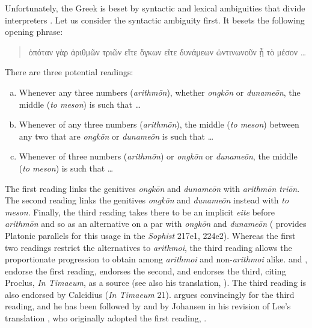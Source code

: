 Unfortunately, the Greek is beset by syntactic and lexical ambiguities that divide interpreters \citep{Prtichard:1990aa}. Let us consider the syntactic ambiguity first. It besets the following opening phrase:
\begin{quote}
{\sbl ὁπόταν γὰρ ἀριθμῶν τριῶν εἴτε ὄγκων εἴτε δυνάμεων ὡντινωνοῦν ᾖ τὸ μέσον \ldots}
\end{quote}
There are three potential readings:
\begin{enumerate}[(a)]
	\item Whenever any three numbers (\emph{arithmōn}), whether \emph{ongkōn} or \emph{dunameōn}, the middle (\emph{to meson}) is such that \ldots
	\item Whenever of any three numbers (\emph{arithmōn}), the middle (\emph{to meson}) between any two that are \emph{ongkōn} or \emph{dunameōn} is such that \ldots
	\item Whenever of three numbers  (\emph{arithmōn}) or \emph{ongkōn} or \emph{dunameōn}, the middle (\emph{to meson}) is such that \ldots
\end{enumerate}
The first reading links the genitives \emph{ongkōn} and \emph{dunameōn} with \emph{arithmōn triōn}. The second reading links the genitives \emph{ongkōn} and \emph{dunameōn} instead with \emph{to meson}. Finally, the third reading takes there to be an implicit \emph{eite} before \emph{arithmōn} and so as an alternative on a par with \emph{ongkōn} and \emph{dunameōn} (\citealt[99]{Taylor:1928qb} provides Platonic parallels for this usage in the \emph{Sophist} 217e1, 224e2). Whereas the first two readings restrict the alternatives to \emph{arithmoi}, the third reading allows the proportionate progression to obtain among \emph{arithmoi} and non-\emph{arithmoi} alike. \citet[97 n12]{Archer-Hind:1888qd} and \citet[59]{Bury:1929jb}, endorse the first reading, \citet[44]{Cornford:1935fk} endorses the second, and \citet[96--99]{Taylor:1928qb} endorses the third, citing Proclus, \emph{In Timaeum}, as a source (see also his translation, \citeyear[28]{Taylor:1929ov}). The third reading is also endorsed by Calcidius (\emph{In Timaeum} 21). \citet{Prtichard:1990aa} argues convincingly for the third reading, and he has been followed by \citet{Zeyl:2000cs} and by Johansen in his revision of Lee's translation \citeyearpar{Lee:2008ca}, who originally adopted the first reading, \citeyearpar{Lee:1965fh}.

